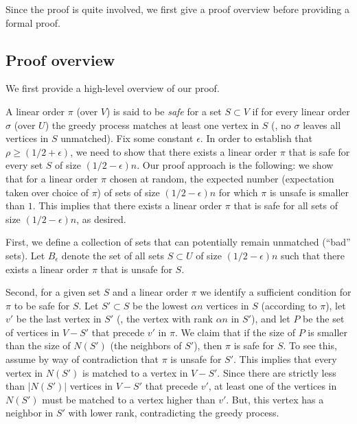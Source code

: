\documentclass{toc}
\theoremstyle{plain}
\begin{document}
%
Since the proof is quite involved, we first give a proof overview before providing a formal proof. 

%
%
%
%

\subsection{Proof overview}
\label{sec:proof-overview}

We first provide a high-level %
overview of our proof.  %
%

A linear order $\pi$ (over $V$) is said to be \emph{safe} for a set $S \subset V$ if for every linear order $\sigma$ (over $U$) the greedy process matches at least one vertex in $S$ (\ie, no $\sigma$ leaves all vertices in $S$ unmatched).
Fix some constant $\epsilon$. In order to establish that $\rho \geq (1/2 + \epsilon)$, we need to show that there exists a linear order $\pi$ that is safe for every set $S$ of size $(1/2-\epsilon)n$.
Our proof approach is the following: we show that for a linear order $\pi$ chosen
%
at random, the expected number (expectation taken over choice of $\pi$) of sets of size $(1/2-\epsilon)n$ for which $\pi$ is unsafe is smaller than $1$.
This implies that there exists a linear order $\pi$ that is safe for all sets of size $(1/2-\epsilon)n$, as desired.

First, we define a collection of sets that can potentially remain unmatched (``bad'' sets).
%
%
%
Let $B_\epsilon$ denote the set of all sets $S \subset U$ of size $(1/2-\epsilon)n$ such that there exists a linear order $\pi$ that is unsafe for $S$.

Second, for a given set $S$ and a linear order $\pi$ we identify a sufficient condition for $\pi$ to be safe for $S$.
Let $S' \subset S$ be the lowest $\alpha n$ vertices in $S$ (according to $\pi$), let $v'$ be the last vertex in $S'$ (\ie, the vertex with rank $\alpha n$ in $S'$), and let $P$ be the set of vertices in $V - S'$ that precede $v'$ in $\pi$.
%
We claim that if the size of $P$ is smaller than the size of $N(S')$ (the neighbors of $S'$), then $\pi$ is safe for $S$.
To see this, assume by way of contradiction that $\pi$ is unsafe for $S'$.
This implies that every vertex in $N(S')$ is matched to a vertex in $V - S'$.
Since there are strictly less than $|N(S')|$ vertices in $V - S'$ that precede $v'$, at least one of the vertices in $N(S')$ must be matched to a vertex higher than $v'$. But, this vertex has a neighbor in $S'$ with lower rank, contradicting the greedy process.
\end{document}
